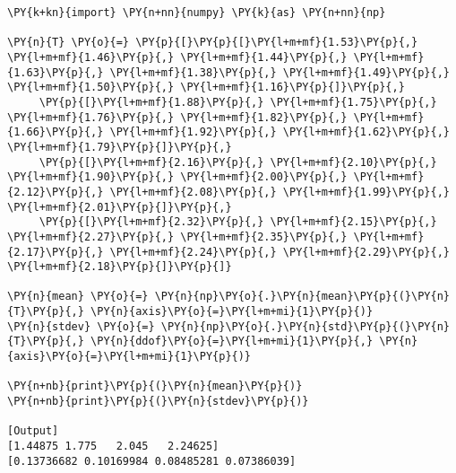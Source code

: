 \begin{Verbatim}[label=\makebox{\href{https://bitbucket.org/lbaldini/statnotes/src/master/snippets/sample\_stat\_numpy\_vec.py}{https://bitbucket.org/.../sample\_stat\_numpy\_vec.py}},commandchars=\\\{\}]
\PY{k+kn}{import} \PY{n+nn}{numpy} \PY{k}{as} \PY{n+nn}{np}

\PY{n}{T} \PY{o}{=} \PY{p}{[}\PY{p}{[}\PY{l+m+mf}{1.53}\PY{p}{,} \PY{l+m+mf}{1.46}\PY{p}{,} \PY{l+m+mf}{1.44}\PY{p}{,} \PY{l+m+mf}{1.63}\PY{p}{,} \PY{l+m+mf}{1.38}\PY{p}{,} \PY{l+m+mf}{1.49}\PY{p}{,} \PY{l+m+mf}{1.50}\PY{p}{,} \PY{l+m+mf}{1.16}\PY{p}{]}\PY{p}{,}
     \PY{p}{[}\PY{l+m+mf}{1.88}\PY{p}{,} \PY{l+m+mf}{1.75}\PY{p}{,} \PY{l+m+mf}{1.76}\PY{p}{,} \PY{l+m+mf}{1.82}\PY{p}{,} \PY{l+m+mf}{1.66}\PY{p}{,} \PY{l+m+mf}{1.92}\PY{p}{,} \PY{l+m+mf}{1.62}\PY{p}{,} \PY{l+m+mf}{1.79}\PY{p}{]}\PY{p}{,}
     \PY{p}{[}\PY{l+m+mf}{2.16}\PY{p}{,} \PY{l+m+mf}{2.10}\PY{p}{,} \PY{l+m+mf}{1.90}\PY{p}{,} \PY{l+m+mf}{2.00}\PY{p}{,} \PY{l+m+mf}{2.12}\PY{p}{,} \PY{l+m+mf}{2.08}\PY{p}{,} \PY{l+m+mf}{1.99}\PY{p}{,} \PY{l+m+mf}{2.01}\PY{p}{]}\PY{p}{,}
     \PY{p}{[}\PY{l+m+mf}{2.32}\PY{p}{,} \PY{l+m+mf}{2.15}\PY{p}{,} \PY{l+m+mf}{2.27}\PY{p}{,} \PY{l+m+mf}{2.35}\PY{p}{,} \PY{l+m+mf}{2.17}\PY{p}{,} \PY{l+m+mf}{2.24}\PY{p}{,} \PY{l+m+mf}{2.29}\PY{p}{,} \PY{l+m+mf}{2.18}\PY{p}{]}\PY{p}{]}

\PY{n}{mean} \PY{o}{=} \PY{n}{np}\PY{o}{.}\PY{n}{mean}\PY{p}{(}\PY{n}{T}\PY{p}{,} \PY{n}{axis}\PY{o}{=}\PY{l+m+mi}{1}\PY{p}{)}
\PY{n}{stdev} \PY{o}{=} \PY{n}{np}\PY{o}{.}\PY{n}{std}\PY{p}{(}\PY{n}{T}\PY{p}{,} \PY{n}{ddof}\PY{o}{=}\PY{l+m+mi}{1}\PY{p}{,} \PY{n}{axis}\PY{o}{=}\PY{l+m+mi}{1}\PY{p}{)}

\PY{n+nb}{print}\PY{p}{(}\PY{n}{mean}\PY{p}{)}
\PY{n+nb}{print}\PY{p}{(}\PY{n}{stdev}\PY{p}{)}

[Output]
[1.44875 1.775   2.045   2.24625]
[0.13736682 0.10169984 0.08485281 0.07386039]
\end{Verbatim}